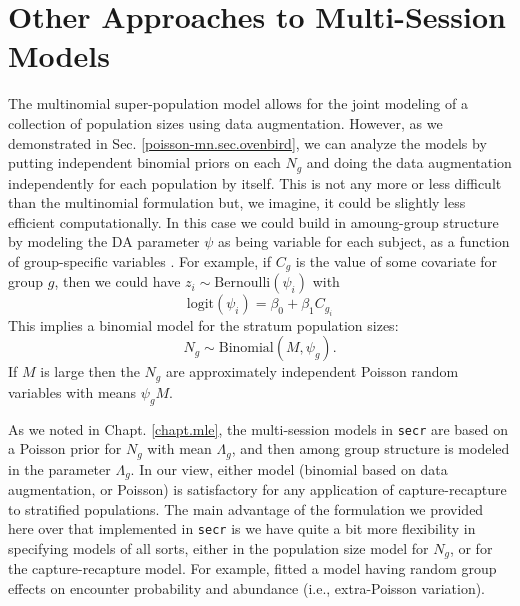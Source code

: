\section{Other Approaches to Multi-Session Models}


The multinomial super-population model allows for the joint modeling of a collection of
population sizes using data augmentation.  However, as we demonstrated
in Sec. \ref{poisson-mn.sec.ovenbird}, we can analyze the models by
putting independent binomial priors on each $N_{g}$ and doing the data
augmentation independently for each population by itself.  This is not
any more or less difficult than the multinomial formulation but, we
imagine, it could be slightly less efficient computationally.  In this
case we could build in amoung-group structure by modeling the DA
parameter $\psi$ as being variable for each subject, as a function of
group-specific variables \citep[see][for an
example]{hendriks_etal:2013}.  For example, if $C_{g}$ is the value of
some covariate for group $g$,
then we could have $z_{i} \sim
\mbox{Bernoulli}( \psi_{i})$ with
\[
 \mbox{logit}(\psi_{i}) = \beta_0 + \beta_1  C_{g_{i}}
\]
This implies a binomial model for the stratum population sizes:
\[
N_{g} \sim \mbox{Binomial}(M, \psi_{g}).
\]
If $M$ is large then the $N_{g}$ are approximately
independent Poisson random variables with means $\psi_{g} M$.

As we noted in Chapt. \ref{chapt.mle},
the multi-session models in \mbox{\tt secr}  are based on a
Poisson prior for $N_{g}$ with mean $\Lambda_{g}$, and then among group structure is modeled in
the parameter $\Lambda_{g}$. In our view, either model (binomial
based on data augmentation, or Poisson) is satisfactory for any
application of capture-recapture to stratified populations.
The main advantage of the formulation we provided here over that
implemented in \mbox{\tt secr} is we have quite a bit more flexibility
in specifying models of all sorts, either in the population size model
for $N_{g}$, or for the capture-recapture model. For example,
\citet{royle_converse:2013} fitted a model having random group effects
on encounter probability and abundance (i.e., extra-Poisson
variation).

